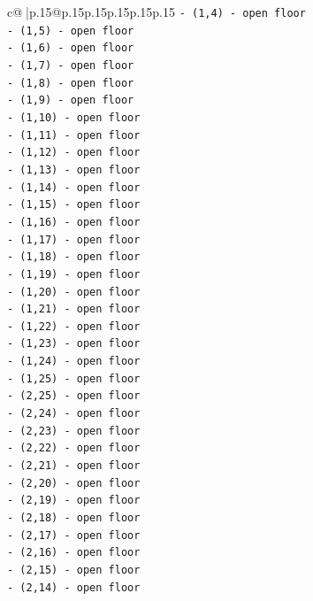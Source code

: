 \documentclass{article}
\begin{document}
{\begin{supertabular}{c@{$\;$}|p{.15\linewidth}@{}p{.15\linewidth}p{.15\linewidth}p{.15\linewidth}p{.15\linewidth}p{.15\linewidth}}
{{{\texttt{{-} (1,4) {-} open floor} \\
\texttt{{-} (1,5) {-} open floor} \\
\texttt{{-} (1,6) {-} open floor} \\
\texttt{{-} (1,7) {-} open floor} \\
\texttt{{-} (1,8) {-} open floor} \\
\texttt{{-} (1,9) {-} open floor} \\
\texttt{{-} (1,10) {-} open floor} \\
\texttt{{-} (1,11) {-} open floor} \\
\texttt{{-} (1,12) {-} open floor} \\
\texttt{{-} (1,13) {-} open floor} \\
\texttt{{-} (1,14) {-} open floor} \\
\texttt{{-} (1,15) {-} open floor} \\
\texttt{{-} (1,16) {-} open floor} \\
\texttt{{-} (1,17) {-} open floor} \\
\texttt{{-} (1,18) {-} open floor} \\
\texttt{{-} (1,19) {-} open floor} \\
\texttt{{-} (1,20) {-} open floor} \\
\texttt{{-} (1,21) {-} open floor} \\
\texttt{{-} (1,22) {-} open floor} \\
\texttt{{-} (1,23) {-} open floor} \\
\texttt{{-} (1,24) {-} open floor} \\
\texttt{{-} (1,25) {-} open floor} \\
\texttt{{-} (2,25) {-} open floor} \\
\texttt{{-} (2,24) {-} open floor} \\
\texttt{{-} (2,23) {-} open floor} \\
\texttt{{-} (2,22) {-} open floor} \\
\texttt{{-} (2,21) {-} open floor} \\
\texttt{{-} (2,20) {-} open floor} \\
\texttt{{-} (2,19) {-} open floor} \\
\texttt{{-} (2,18) {-} open floor} \\
\texttt{{-} (2,17) {-} open floor} \\
\texttt{{-} (2,16) {-} open floor} \\
\texttt{{-} (2,15) {-} open floor} \\
\texttt{{-} (2,14) {-} open floor} \\
}}}
\end{supertabular}}
\end{document}
